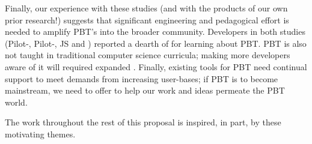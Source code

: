 Finally, our experience with these studies (and with the products of
our own prior research!) suggests
that significant engineering and pedagogical effort is needed to amplify
PBT's  into the broader community.  Developers in both studies
(Pilot-, Pilot-, JS  and
) reported a dearth of  for
learning about PBT.  PBT is also not
taught in traditional computer science curricula; making more developers
aware of it will required expanded
. Finally, existing tools for PBT need continual
support to meet demands from increasing user-bases; if PBT is to become mainstream, we
need to offer 
to help our
work and ideas permeate the PBT world.

The work throughout the rest of this proposal is inspired, in part, by these
motivating themes.


\iflater{}\fi

